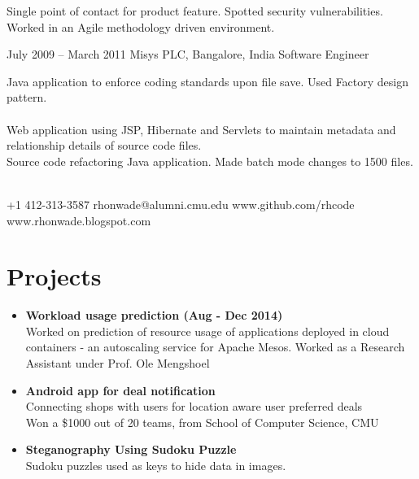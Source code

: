 \documentclass{tccv}
\begin{document}
\begin{eventlist}
Single point of contact for product feature. Spotted security vulnerabilities. Worked in an Agile methodology driven environment.

\item{July 2009 -- March 2011}
     {Misys PLC, Bangalore, India}
     {Software Engineer}

Java application to enforce coding standards upon file save. Used Factory design pattern.\\
\\

Web application using JSP, Hibernate and Servlets to maintain metadata and relationship details of source code files.\\

Source code refactoring Java application. Made batch mode changes to 1500 files.\\
\\
\end{eventlist}



    {+1 412-313-3587}
    {rhonwade@alumni.cmu.edu}
    {www.github.com/rhcode}
    {www.rhonwade.blogspot.com}

\section{Projects}

\begin{itemize}

\item\textbf{Workload usage prediction (Aug - Dec 2014)}\\
     {Worked on prediction of resource usage of applications deployed in cloud containers - an autoscaling service for Apache Mesos. Worked as a Research Assistant under Prof. Ole Mengshoel}

\item\textbf{Android app for deal notification}\\
     {Connecting shops with users for location aware user preferred deals}\\
     Won a \$1000 {} out of 20 teams, from School of Computer Science, CMU

\item\textbf{Steganography Using Sudoku Puzzle}\\
     {Sudoku puzzles used as keys to hide data in images.
     }

\end{itemize}
\end{document}
